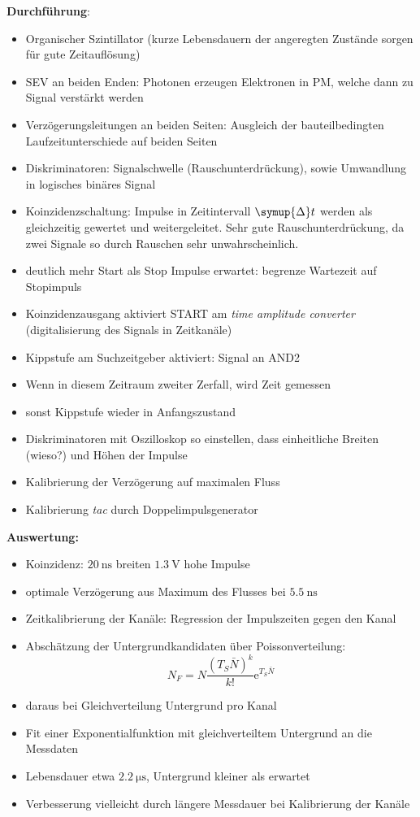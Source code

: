 \textbf{Durchführung}:
\begin{itemize}
    \item Organischer Szintillator (kurze Lebensdauern der angeregten Zustände sorgen für gute Zeitauflösung)
    \item SEV an beiden Enden: Photonen erzeugen Elektronen in PM, welche dann zu Signal verstärkt werden
    \item Verzögerungsleitungen an beiden Seiten: Ausgleich der bauteilbedingten Laufzeitunterschiede auf beiden Seiten
    \item Diskriminatoren: Signalschwelle (Rauschunterdrückung), sowie Umwandlung in logisches binäres Signal
    \item Koinzidenzschaltung: Impulse in Zeitintervall $\symup{\Delta}t$ werden als gleichzeitig gewertet und weitergeleitet. Sehr gute Rauschunterdrückung, da zwei Signale so durch Rauschen sehr unwahrscheinlich.
    \item deutlich mehr Start als Stop Impulse erwartet: begrenze Wartezeit auf Stopimpuls
    \item Koinzidenzausgang aktiviert START am \textit{time amplitude converter} (digitalisierung des Signals in Zeitkanäle)
    \item Kippstufe am Suchzeitgeber aktiviert: Signal an AND2
    \item Wenn in diesem Zeitraum zweiter Zerfall, wird Zeit gemessen
    \item sonst Kippstufe wieder in Anfangszustand
    \item Diskriminatoren mit Oszilloskop so einstellen, dass einheitliche Breiten (wieso?) und Höhen der Impulse
    \item Kalibrierung der Verzögerung auf maximalen Fluss
    \item Kalibrierung \textit{tac} durch Doppelimpulsgenerator
\end{itemize}

\textbf{Auswertung:}
\begin{itemize}
    \item Koinzidenz: $\SI{20}{\nano\second}$ breiten $\SI{1.3}{\volt}$ hohe Impulse
    \item optimale Verzögerung aus Maximum des Flusses bei $\SI{5,5}{\nano\second}$
    \item Zeitkalibrierung der Kanäle: Regression der Impulszeiten gegen den Kanal
    \item Abschätzung der Untergrundkandidaten über Poissonverteilung:
        \begin{equation}
            N_F = N\frac{(T_S\bar{N})^k}{k!}\text{e}^{T_S\bar{N}}
        \end{equation}
    \item daraus bei Gleichverteilung Untergrund pro Kanal
    \item Fit einer Exponentialfunktion mit gleichverteiltem Untergrund an die Messdaten
    \item Lebensdauer etwa $\SI{2,2}{\micro\second}$, Untergrund kleiner als erwartet
    \item Verbesserung vielleicht durch längere Messdauer bei Kalibrierung der Kanäle
\end{itemize}
